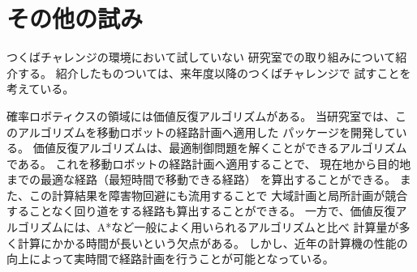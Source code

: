 \documentclass[twocolumn,9pt]{jsproceedings}
\begin{document}



\section{その他の試み}

つくばチャレンジの環境において試していない
研究室での取り組みについて紹介する。
紹介したものついては、来年度以降のつくばチャレンジで
試すことを考えている。

確率ロボティクスの領域には価値反復アルゴリズム\cite{上田詳解}がある。
当研究室では、このアルゴリズムを移動ロボットの経路計画へ適用した
パッケージを開発している\cite{ueda2023JRM}。
価値反復アルゴリズムは、最適制御問題を解くことができるアルゴリズムである。
これを移動ロボットの経路計画へ適用することで、
現在地から目的地までの最適な経路（最短時間で移動できる経路）
を算出することができる。
また、この計算結果を障害物回避にも流用することで
大域計画と局所計画が競合することなく回り道をする経路も算出することができる。
一方で、価値反復アルゴリズムには、A*など一般によく用いられるアルゴリズムと比べ
計算量が多く計算にかかる時間が長いという欠点がある。
しかし、近年の計算機の性能の向上によって実時間で経路計画を行うことが可能となっている。
\end{document}
